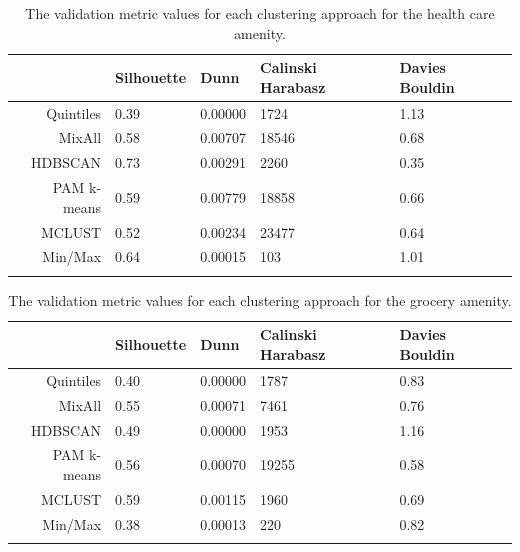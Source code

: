 \documentclass[11pt, a4paper]{article}
\begin{document}
\centering
\begin{longtable}[H]{|r|llll|}
  \hline
 & Silhouette & Dunn & Calinski Harabasz & Davies Bouldin \\ 
  \hline
Quintiles & 0.39 & 0.00000 &  1724 & 1.13 \\ 
   \hline
MixAll & 0.58 & 0.00707 & 18546 & 0.68 \\ 
   \hline
HDBSCAN & 0.73 & 0.00291 &  2260 & 0.35 \\ 
   \hline
PAM k-means & 0.59 & 0.00779 & 18858 & 0.66 \\ 
   \hline
MCLUST & 0.52 & 0.00234 & 23477 & 0.64 \\ 
   \hline
Min/Max & 0.64 & 0.00015 &   103 & 1.01 \\ 
   \hline
\caption[Health care validation metrics]{The validation metric values for each clustering approach for the health care amenity.}\label{healthcarevalid}
\end{longtable}









\centering
\begin{longtable}[H]{|r|llll|}
  \hline
 & Silhouette & Dunn & Calinski Harabasz & Davies Bouldin \\ 
  \hline
Quintiles & 0.40 & 0.00000 &  1787 & 0.83 \\ 
   \hline
MixAll & 0.55 & 0.00071 &  7461 & 0.76 \\ 
   \hline
HDBSCAN & 0.49 & 0.00000 &  1953 & 1.16 \\ 
   \hline
PAM k-means & 0.56 & 0.00070 & 19255 & 0.58 \\ 
   \hline
MCLUST & 0.59 & 0.00115 &  1960 & 0.69 \\ 
   \hline
Min/Max & 0.38 & 0.00013 &   220 & 0.82 \\ 
   \hline
\caption[Grocery validation metrics]{The validation metric values for each clustering approach for the grocery amenity.}\label{groceryvalid}
\end{longtable}
\end{document}
